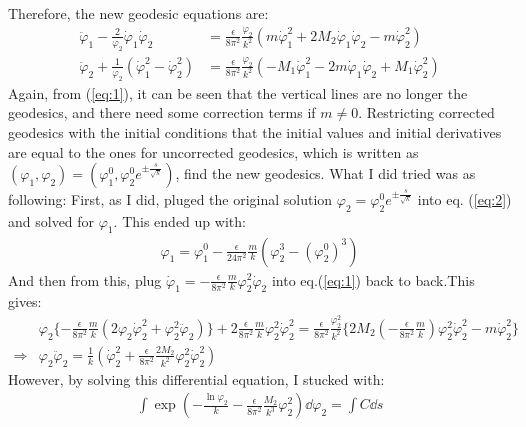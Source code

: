 \documentclass[fleqn]{article}
\begin{document}
Therefore, the new geodesic equations are:
\begin{align}[left=\empheqlbrace]
\label{eq:1}
\ddot  \varphi_{1} - \frac{2}{ \varphi_{2}}  \dot \varphi_{1} \dot \varphi_{2} & = \frac{\epsilon}{8\pi^{2}}\frac{\varphi_{2}}{k^{2}} (m\dot \varphi_{1} ^{2} + 2M_{2} \dot \varphi_{1} \dot \varphi_{2} - m \dot \varphi_{2}^{2}) \\
\label{eq:2}
\ddot \varphi_{2} + \frac{1}{\varphi_{2}} (\dot \varphi_{1} ^{2} - \dot \varphi_{2} ^{2}) & = \frac{\epsilon}{8\pi^{2}} \frac{\varphi_{2}}{k^{2}} (-M_{1} \dot \varphi_{1} ^{2} - 2m \dot \varphi_{1} \dot \varphi_{2} + M_{1} \dot \varphi_{2} ^{2})
\end{align}
Again, from (\ref{eq:1}), it can be seen that the vertical lines are no longer the geodesics, and there need some correction terms if $m \neq 0$. Restricting corrected geodesics with the initial conditions that the initial values and initial derivatives are equal to the ones for uncorrected geodesics, which is written as $(\varphi _{1}, \varphi_{2}) = (\varphi_{1} ^{0}, \varphi_{2} ^{0} e^{\pm \frac{s}{\sqrt{k}}})$, find the new geodesics.
What I did tried was as following: First, as I did, pluged the original solution $\varphi_{2}= \varphi_2^{0} e^{\pm \frac{s}{\sqrt{k}}}$ into eq. (\ref{eq:2}) and solved for $\varphi_{1}$. This ended up with:
\begin{align}
    \varphi_{1} = \varphi_{1}^{0} - \frac{\epsilon}{24\pi^2}\frac{m}{k}(\varphi_{2}^{3}  - (\varphi_{2} ^{0}) ^{3})
\end{align}
And then from this, plug $\dot \varphi_{1} = -\frac{\epsilon}{8\pi^2}\frac{m}{k} \varphi_{2}^{2} \dot \varphi_{2}$ into eq.(\ref{eq:1}) back to back.This gives:
\begin{align}
    &\varphi_{2}\lbrace -\frac{\epsilon}{8\pi^{2}}\frac{m}{k}(2\varphi_{2}\dot \varphi_{2}^{2} + \varphi_{2}^{2}\ddot \varphi_{2}) \rbrace + 2 \frac{\epsilon}{8\pi^{2}}\frac{m}{k}\varphi_{2} ^{2} \dot \varphi_{2} ^{2} = \frac{\epsilon}{8\pi^2}
    \frac{\varphi_{2}^{2}}{k^2}\lbrace 2M_{2} (-\frac{\epsilon}{8\pi^{2}}\frac{m}{k})\varphi_{2}^{2} \dot \varphi_{2} ^{2} - m \dot \varphi_{2} ^{2} \rbrace \nonumber \\
    \Rightarrow & \varphi_{2} \ddot \varphi_{2} = \frac{1}{k} (\dot \varphi_{2}^{2} + \frac{\epsilon}{8\pi^2} \frac{2M_{2}}{k^2} \varphi_{2}^{2} \dot \varphi_{2} ^{2})
\end{align}
However, by solving this differential equation, I stucked with:
\begin{align}
    \int \exp (-\frac{\ln \varphi_{2}}{k} - \frac{\epsilon}{8\pi^{2}}\frac{M_{2}}{k^3}\varphi_{2}^{2} ) \dd\varphi_{2} = \int C \dd s 
\end{align}
\end{document}
